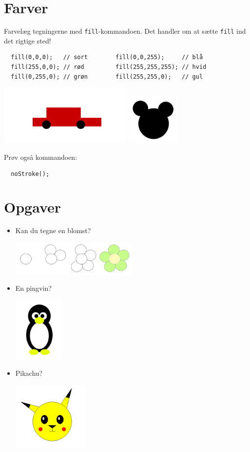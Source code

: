 \documentclass[oneside,a4paper,10pts,article]{memoir}
\begin{document}
\newpage
\chapter{Farver}
Farvelæg tegningerne med \texttt{fill}-kommandoen. Det handler om at
sætte \texttt{fill} ind det rigtige sted!
\begin{lstlisting}
  fill(0,0,0);   // sort        fill(0,0,255);     // blå
  fill(255,0,0); // rød         fill(255,255,255); // hvid
  fill(0,255,0); // grøn        fill(255,255,0);   // gul
\end{lstlisting}
\vspace{-3mm}
\includegraphics[width=0.5\textwidth]{pics/bil-farvet.png}
\includegraphics[width=0.20\textwidth]{pics/mickey_simpel.png}

\noindent
Prøv også kommandoen:
\begin{lstlisting}
  noStroke();
\end{lstlisting}

\chapter{Opgaver}
\begin{itemize}
\item Kan du tegne en blomst?

  \includegraphics[width=0.5\textwidth]{pics/blomst.png}

\item En pingvin?

  \includegraphics[width=0.20\textwidth]{pics/pingvin.png}

\item Pikachu?

  \includegraphics[width=0.3\textwidth]{pics/pikachu.png}
\end{itemize}
\end{document}
